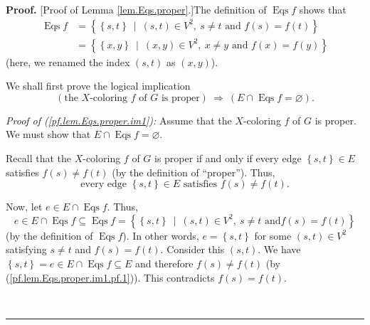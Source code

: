 \documentclass[numbers=enddot,12pt,final,onecolumn,notitlepage]{scrartcl}%
\theoremstyle{definition}
\newenvironment{proof}[1][Proof]{\noindent\textbf{#1.} }{\ \rule{0.5em}{0.5em}}
\newenvironment{verlong}{}{}
\begin{document}
\begin{verlong}
\begin{proof}
[Proof of Lemma \ref{lem.Eqs.proper}.]The definition of $\operatorname*{Eqs}f$
shows that%
\begin{align}
\operatorname*{Eqs}f  &  =\left\{  \left\{  s,t\right\}  \ \mid\ \left(
s,t\right)  \in V^{2},\ s\neq t\text{ and }f\left(  s\right)  =f\left(
t\right)  \right\} \nonumber\\
&  =\left\{  \left\{  x,y\right\}  \ \mid\ \left(  x,y\right)  \in
V^{2},\ x\neq y\text{ and }f\left(  x\right)  =f\left(  y\right)  \right\}
\label{pf.lem.Eqs.proper.0}%
\end{align}
(here, we renamed the index $\left(  s,t\right)  $ as $\left(  x,y\right)  $).

We shall first prove the logical implication%
\begin{equation}
\left(  \text{the }X\text{-coloring }f\text{ of }G\text{ is proper}\right)
\ \Longrightarrow\ \left(  E\cap\operatorname*{Eqs}f=\varnothing\right)  .
\label{pf.lem.Eqs.proper.im1}%
\end{equation}


\textit{Proof of (\ref{pf.lem.Eqs.proper.im1}):} Assume that the $X$-coloring
$f$ of $G$ is proper. We must show that $E\cap\operatorname*{Eqs}%
f=\varnothing$.

Recall that the $X$-coloring $f$ of $G$ is proper if and only if every edge
$\left\{  s,t\right\}  \in E$ satisfies $f\left(  s\right)  \neq f\left(
t\right)  $ (by the definition of \textquotedblleft proper\textquotedblright).
Thus,%
\begin{equation}
\text{every edge }\left\{  s,t\right\}  \in E\text{ satisfies }f\left(
s\right)  \neq f\left(  t\right)  . \label{pf.lem.Eqs.proper.im1.pf.1}%
\end{equation}


Now, let $e\in E\cap\operatorname*{Eqs}f$. Thus,%
\[
e\in E\cap\operatorname*{Eqs}f\subseteq\operatorname*{Eqs}f=\left\{  \left\{
s,t\right\}  \ \mid\ \left(  s,t\right)  \in V^{2},\ s\neq t\text{ and
}f\left(  s\right)  =f\left(  t\right)  \right\}
\]
(by the definition of $\operatorname*{Eqs}f$). In other words, $e=\left\{
s,t\right\}  $ for some $\left(  s,t\right)  \in V^{2}$ satisfying $s\neq t$
and $f\left(  s\right)  =f\left(  t\right)  $. Consider this $\left(
s,t\right)  $. We have $\left\{  s,t\right\}  =e\in E\cap\operatorname*{Eqs}%
f\subseteq E$ and therefore $f\left(  s\right)  \neq f\left(  t\right)  $ (by
(\ref{pf.lem.Eqs.proper.im1.pf.1})). This contradicts $f\left(  s\right)
=f\left(  t\right)  $.


\end{proof}
\end{verlong}
\end{document}
